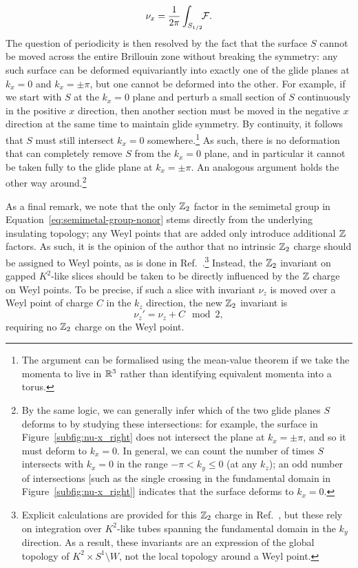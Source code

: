 \begin{equation}\label{eq:z-invariant2}
	\nu_x = \frac{1}{2\pi}\int_{S_{1/2}}\!\!\mathcal{F}.
\end{equation}
The question of periodicity is then resolved by the fact that the surface $S$ cannot be moved across the entire Brillouin zone without breaking the symmetry: any such surface can be deformed equivariantly into exactly one of the glide planes at $k_x=0$ and $k_x=\pm\pi$, but one cannot be deformed into the other. For example, if we start with $S$ at the $k_x=0$ plane and perturb a small section of $S$ continuously in the positive $x$ direction, then another section must be moved in the negative $x$ direction at the same time to maintain glide symmetry. By continuity, it follows that $S$ must still intersect $k_x=0$ somewhere.\footnote{
	The argument can be formalised using the mean-value theorem if we take the momenta to live in $\mathbb{R}^3$ rather than identifying equivalent momenta into a torus.}
As such, there is no deformation that can completely remove $S$ from the $k_x=0$ plane, and in particular it cannot be taken fully to the glide plane at $k_x=\pm\pi$. An analogous argument holds the other way around.\footnote{
	By the same logic, we can generally infer which of the two glide planes $S$ deforms to by studying these intersections: for example, the surface in Figure~\ref{subfig:nu-x_right} does not intersect the plane at $k_x=\pm\pi$, and so it must deform to $k_x=0$. In general, we can count the number of times $S$ intersects with $k_x=0$ in the range $-\pi<k_y\leq 0$ (at any $k_z$); an odd number of intersections [such as the single crossing in the fundamental domain in Figure~\ref{subfig:nu-x_right}] indicates that the surface deforms to $k_x=0$.}

As a final remark, we note that the only $\mathbb{Z}_2$ factor in the semimetal group in Equation~\eqref{eq:semimetal-group-nonor} stems directly from the underlying insulating topology; any Weyl points that are added only introduce additional $\mathbb{Z}$ factors. As such, it is the opinion of the author that no intrinsic $\mathbb{Z}_2$ charge should be assigned to Weyl points, as is done in Ref.~\cite{Fonseca-Vaidya_nonorientable}.\footnote{
	Explicit calculations are provided for this $\mathbb{Z}_2$ charge in Ref.~\cite{Fonseca-Vaidya_nonorientable}, but these rely on integration over $K^2$-like tubes spanning the fundamental domain in the $k_y$ direction. As a result, these invariants are an expression of the global topology of $K^2\times S^1\setminus W$, not the local topology around a Weyl point.}
Instead, the $\mathbb{Z}_2$ invariant on gapped $K^2$-like slices should be taken to be directly influenced by the $\mathbb{Z}$ charge on Weyl points. To be precise, if such a slice with invariant $\nu_z$ is moved over a Weyl point of charge $C$ in the $k_z$ direction, the new $\mathbb{Z}_2$ invariant is
\begin{equation*}
	\nu_z' = \nu_z + C \mod 2,
\end{equation*}
requiring no $\mathbb{Z}_2$ charge on the Weyl point.
	
